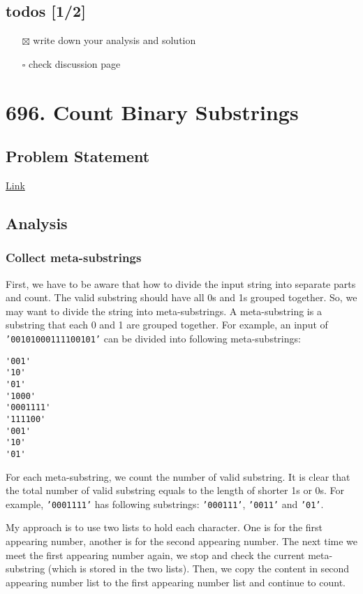 \documentclass[11pt]{article}
\begin{document}
\subsection{todos [1/2]}
\label{sec:orgdf11b42}
\begin{itemize}
\item[{$\boxtimes$}] write down your analysis and solution
\item[{$\square$}] check discussion page
\end{itemize}
\section{696. Count Binary Substrings}
\label{sec:org494aaae}
\subsection{Problem Statement}
\label{sec:org8caf668}
\href{https://leetcode.com/problems/count-binary-substrings/}{Link}
\subsection{Analysis}
\label{sec:org8b299ad}
\subsubsection{Collect meta-substrings \label{org8ee496f}}
\label{sec:org8cf8d7d}
First, we have to be aware that how to divide the input string into separate parts and count. The valid substring should have all 0s and 1s grouped together. So, we may want to divide the string into meta-substrings. A meta-substring is a substring that each 0 and 1 are grouped together. For example, an input of \texttt{'00101000111100101'} can be divided into following meta-substrings:
\begin{Verbatim}[frame=single]
'001'
'10'
'01'
'1000'
'0001111'
'111100'
'001'
'10'
'01'
\end{Verbatim}
For each meta-substring, we count the number of valid substring. It is clear that the total number of valid substring equals to the length of shorter 1s or 0s. For example, \texttt{'0001111'} has following substrings: \texttt{'000111'}, \texttt{'0011'} and \texttt{'01'}.

My approach is to use two lists to hold each character. One is for the first appearing number, another is for the second appearing number. The next time we meet the first appearing number again, we stop and check the current meta-substring (which is stored in the two lists). Then, we copy the content in second appearing number list to the first appearing number list and continue to count.
\end{document}
